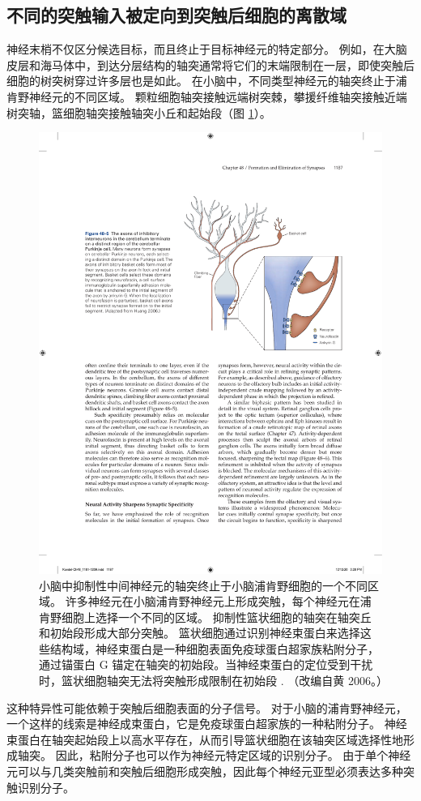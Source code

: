 \subsection{不同的突触输入被定向到突触后细胞的离散域}

神经末梢不仅区分候选目标，而且终止于目标神经元的特定部分。
例如，在大脑皮层和海马体中，到达分层结构的轴突通常将它们的末端限制在一层，即使突触后细胞的树突树穿过许多层也是如此。
在小脑中，不同类型神经元的轴突终止于浦肯野神经元的不同区域。
颗粒细胞轴突接触远端树突棘，攀援纤维轴突接触近端树突轴，篮细胞轴突接触轴突小丘和起始段（图 \ref{fig:48_5}）。


\begin{figure}[htbp]
	\centering
	\includegraphics[width=0.7\linewidth]{chap48/fig_48_5}
	\caption{小脑中抑制性中间神经元的轴突终止于小脑浦肯野细胞的一个不同区域。 许多神经元在小脑浦肯野神经元上形成突触，每个神经元在浦肯野细胞上选择一个不同的区域。 抑制性篮状细胞的轴突在轴突丘和初始段形成大部分突触。 篮状细胞通过识别神经束蛋白来选择这些结构域，神经束蛋白是一种细胞表面免疫球蛋白超家族粘附分子，通过锚蛋白 G 锚定在轴突的初始段。当神经束蛋白的定位受到干扰时，篮状细胞轴突无法将突触形成限制在初始段 . （改编自黄 2006。）}
	\label{fig:48_5}
\end{figure}


这种特异性可能依赖于突触后细胞表面的分子信号。
对于小脑的浦肯野神经元，一个这样的线索是神经成束蛋白，它是免疫球蛋白超家族的一种粘附分子。
神经束蛋白在轴突起始段上以高水平存在，从而引导篮状细胞在该轴突区域选择性地形成轴突。
因此，粘附分子也可以作为神经元特定区域的识别分子。
由于单个神经元可以与几类突触前和突触后细胞形成突触，因此每个神经元亚型必须表达多种突触识别分子。



